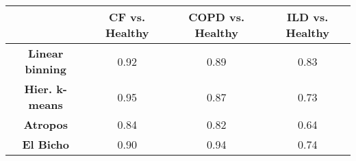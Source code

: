 
\begin{table}
 \centering
   \begin{tabular}{c c c c}
   \toprule
   {} & {\bf CF vs. Healthy} & {\bf COPD vs. Healthy} & {\bf ILD vs. Healthy} \\
   \hline
   {\bf Linear binning} & 0.92  &  0.89  &  0.83  \\
   {\bf Hier. k-means} & 0.95  &  0.87  &  0.73  \\
   {\bf Atropos} &  0.84  &  0.82  &  0.64  \\
   {\bf El Bicho} &  0.90  &  0.94  &  0.74  \\
   \hline
   \bottomrule
   \end{tabular}
 \caption{}
 \label{table:variance}
\end{table}

